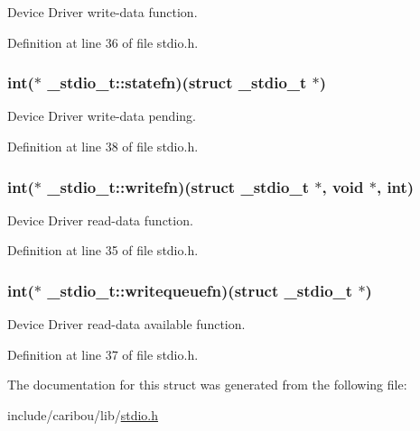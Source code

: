 Device Driver write-\/data function. 



Definition at line 36 of file stdio.\-h.

\hypertarget{struct__stdio__t_ac2642f9c5da1a64df85c6d67783a75e2}{
\subsubsection[{statefn}]{\setlength{\rightskip}{0pt plus 5cm}int($\ast$ \-\_\-stdio\-\_\-t\-::statefn)(struct {\bf \-\_\-stdio\-\_\-t} $\ast$)}}\label{struct__stdio__t_ac2642f9c5da1a64df85c6d67783a75e2}


Device Driver write-\/data pending. 



Definition at line 38 of file stdio.\-h.

\hypertarget{struct__stdio__t_aa50ed1df960be87cd28e05a1df7e9ddd}{
\subsubsection[{writefn}]{\setlength{\rightskip}{0pt plus 5cm}int($\ast$ \-\_\-stdio\-\_\-t\-::writefn)(struct {\bf \-\_\-stdio\-\_\-t} $\ast$, void $\ast$, int)}}\label{struct__stdio__t_aa50ed1df960be87cd28e05a1df7e9ddd}


Device Driver read-\/data function. 



Definition at line 35 of file stdio.\-h.

\hypertarget{struct__stdio__t_ae78e9d8689c33c835ac7551504937851}{
\subsubsection[{writequeuefn}]{\setlength{\rightskip}{0pt plus 5cm}int($\ast$ \-\_\-stdio\-\_\-t\-::writequeuefn)(struct {\bf \-\_\-stdio\-\_\-t} $\ast$)}}\label{struct__stdio__t_ae78e9d8689c33c835ac7551504937851}


Device Driver read-\/data available function. 



Definition at line 37 of file stdio.\-h.



The documentation for this struct was generated from the following file\-:\begin{DoxyCompactItemize}
\item 
include/caribou/lib/\hyperlink{stdio_8h}{stdio.\-h}\end{DoxyCompactItemize}
